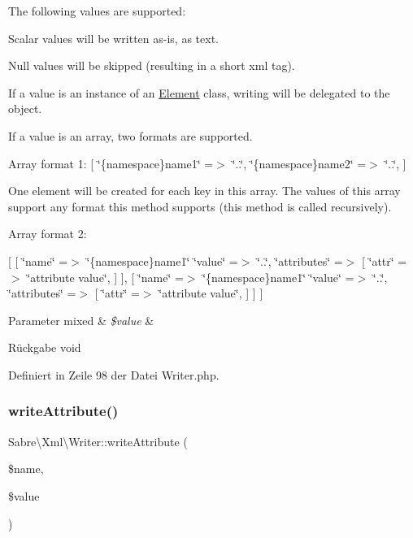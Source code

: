 The following values are supported\+:
\begin{DoxyEnumerate}
\item Scalar values will be written as-\/is, as text.
\item Null values will be skipped (resulting in a short xml tag).
\item If a value is an instance of an \mbox{\hyperlink{interface_sabre_1_1_xml_1_1_element}{Element}} class, writing will be delegated to the object.
\item If a value is an array, two formats are supported.
\end{DoxyEnumerate}

Array format 1\+: \mbox{[} \char`\"{}\{namespace\}name1\char`\"{} =$>$ \char`\"{}..\char`\"{}, \char`\"{}\{namespace\}name2\char`\"{} =$>$ \char`\"{}..\char`\"{}, \mbox{]}

One element will be created for each key in this array. The values of this array support any format this method supports (this method is called recursively).

Array format 2\+:

\mbox{[} \mbox{[} \char`\"{}name\char`\"{} =$>$ \char`\"{}\{namespace\}name1\char`\"{} \char`\"{}value\char`\"{} =$>$ \char`\"{}..\char`\"{}, \char`\"{}attributes\char`\"{} =$>$ \mbox{[} \char`\"{}attr\char`\"{} =$>$ \char`\"{}attribute value\char`\"{}, \mbox{]} \mbox{]}, \mbox{[} \char`\"{}name\char`\"{} =$>$ \char`\"{}\{namespace\}name1\char`\"{} \char`\"{}value\char`\"{} =$>$ \char`\"{}..\char`\"{}, \char`\"{}attributes\char`\"{} =$>$ \mbox{[} \char`\"{}attr\char`\"{} =$>$ \char`\"{}attribute value\char`\"{}, \mbox{]} \mbox{]} \mbox{]}


\begin{DoxyParams}[1]{Parameter}
mixed & {\em \$value} & \\
\hline
\end{DoxyParams}
\begin{DoxyReturn}{Rückgabe}
void 
\end{DoxyReturn}


Definiert in Zeile 98 der Datei Writer.\+php.

\mbox{\label{class_sabre_1_1_xml_1_1_writer_a1bd8ec6a35705bf1b001d453049c8336}} 
\subsubsection{\texorpdfstring{write\+Attribute()}{writeAttribute()}}
{\footnotesize\ttfamily Sabre\textbackslash{}\+Xml\textbackslash{}\+Writer\+::write\+Attribute (\begin{DoxyParamCaption}\item[{}]{\$name,  }\item[{}]{\$value }\end{DoxyParamCaption})}


